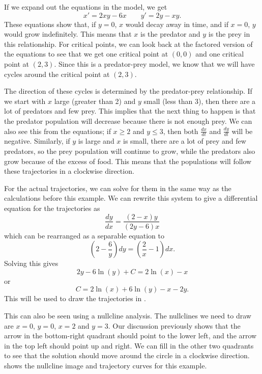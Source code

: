 \begin{exampleSol}
If we expand out the equations in the model, we get
\begin{equation*}
x' = 2xy - 6x \qquad y' = 2y - xy.
\end{equation*}
These equations show that, if $y=0$, $x$ would decay away in time, and if $x=0$, $y$ would grow indefinitely. This means that $x$ is the predator and $y$ is the prey in this relationship. For critical points, we can look back at the factored version of the equations to see that we get one critical point at $(0,0)$ and one critical point at $(2, 3)$. Since this is a predator-prey model, we know that we will have cycles around the critical point at $(2,3)$. 

The direction of these cycles is determined by the predator-prey relationship. If we start with $x$ large (greater than 2) and $y$ small (less than 3), then there are a lot of predators and few prey. This implies that the next thing to happen is that the predator population will decrease because there is not enough prey. We can also see this from the equations; if $x \geq 2$ and $y \leq 3$, then both $\frac{dx}{dt}$ and $\frac{dy}{dt}$ will be negative. Similarly, if $y$ is large and $x$ is small, there are a lot of prey and few predators, so the prey population will continue to grow, while the predators also grow because of the excess of food. This means that the populations will follow these trajectories in a clockwise direction. 

For the actual trajectories, we can solve for them in the same way as the calculations before this example. We can rewrite this system to give a differential equation for the trajectories as 
\begin{equation*}
\frac{dy}{dx} = \frac{(2-x)y}{(2y-6)x}
\end{equation*}
which can be rearranged as a separable equation to
\begin{equation*}
\left(2 - \frac{6}{y}\right) dy = \left(\frac{2}{x} - 1\right) dx.
\end{equation*}
Solving this gives
\begin{equation*}
2y - 6\ln(y) + C = 2\ln(x) - x
\end{equation*}
or
\begin{equation*}
C = 2\ln(x) + 6\ln(y) - x - 2y.
\end{equation*}
This will be used to draw the trajectories in .

This can also be seen using a nullcline analysis. The nullclines we need to draw are $x=0$, $y=0$, $x=2$ and $y=3$. Our discussion previously shows that the arrow in the bottom-right quadrant should point to the lower left, and the arrow in the top left should point up and right. We can fill in the other two quadrants to see that the solution should move around the circle in a clockwise direction.  shows the nullcline image and trajectory curves for this example.
\end{exampleSol}

